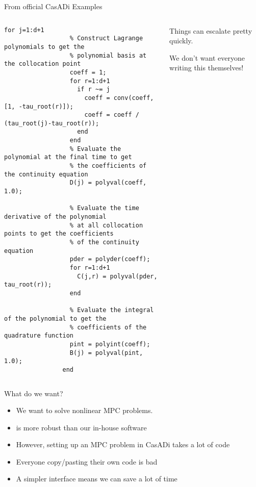 \documentclass[xcolor=dvipsnames,handout]{beamer}
\begin{document}
\begin{frame}[fragile]{From official CasADi Examples}
    \begin{columns}
        \begin{column}{.65\textwidth}
            \begin{lstlisting}[basicstyle=\ttfamily\fontsize{6}{8}\selectfont,gobble=16]
                for j=1:d+1
                  % Construct Lagrange polynomials to get the
                  % polynomial basis at the collocation point
                  coeff = 1;
                  for r=1:d+1
                    if r ~= j
                      coeff = conv(coeff, [1, -tau_root(r)]);
                      coeff = coeff / (tau_root(j)-tau_root(r));
                    end
                  end
                  % Evaluate the polynomial at the final time to get
                  % the coefficients of the continuity equation
                  D(j) = polyval(coeff, 1.0);
                
                  % Evaluate the time derivative of the polynomial
                  % at all collocation points to get the coefficients
                  % of the continuity equation
                  pder = polyder(coeff);
                  for r=1:d+1
                    C(j,r) = polyval(pder, tau_root(r));
                  end
                
                  % Evaluate the integral of the polynomial to get the
                  % coefficients of the quadrature function
                  pint = polyint(coeff);
                  B(j) = polyval(pint, 1.0);
                end
            \end{lstlisting}
        \end{column}
        \begin{column}{.3\textwidth}
            Things can escalate pretty quickly. \pause
            
            \bigskip
            
            We don't want everyone writing this themselves!
        \end{column}
    \end{columns}
\end{frame}

\begin{frame}{What do we want?}
    \begin{itemize}
        \item We want to solve nonlinear MPC problems.
        \item \casadi{} is more robust than our in-house software
        \item However, setting up an MPC problem in CasADi takes a lot of code
        \item Everyone copy/pasting their own code is bad
        \item A simpler interface means we can save a lot of time
    \end{itemize}
\end{frame}
\end{document}
